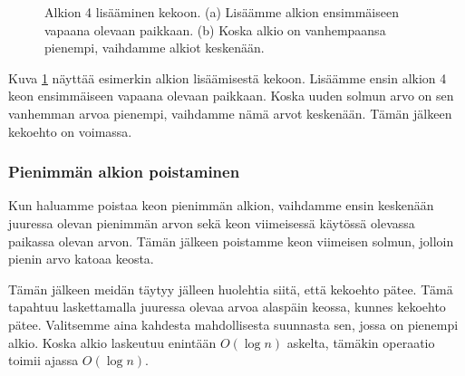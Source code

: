 \begin{figure}
\center
{}
\caption{Alkion 4 lisääminen kekoon. (a) Lisäämme alkion ensimmäiseen
vapaana olevaan paikkaan. (b) Koska alkio on vanhempaansa pienempi,
vaihdamme alkiot keskenään.}
\label{fig:keklis}
\end{figure}

Kuva \ref{fig:keklis} näyttää esimerkin alkion lisäämisestä kekoon.
Lisäämme ensin alkion 4 keon ensimmäiseen vapaana olevaan paikkaan.
Koska uuden solmun arvo on sen vanhemman arvoa pienempi,
vaihdamme nämä arvot keskenään. Tämän jälkeen kekoehto on voimassa.

\subsubsection{Pienimmän alkion poistaminen}

Kun haluamme poistaa keon pienimmän alkion, vaihdamme ensin keskenään
juuressa olevan pienimmän arvon sekä keon viimeisessä käytössä olevassa
paikassa olevan arvon. Tämän jälkeen poistamme keon viimeisen solmun,
jolloin pienin arvo katoaa keosta.

Tämän jälkeen meidän täytyy jälleen huolehtia siitä, että kekoehto pätee.
Tämä tapahtuu laskettamalla juuressa olevaa arvoa alaspäin keossa,
kunnes kekoehto pätee. Valitsemme aina kahdesta mahdollisesta suunnasta sen,
jossa on pienempi alkio.
Koska alkio laskeutuu enintään $O(\log n)$ askelta,
tämäkin operaatio toimii ajassa $O(\log n)$.

